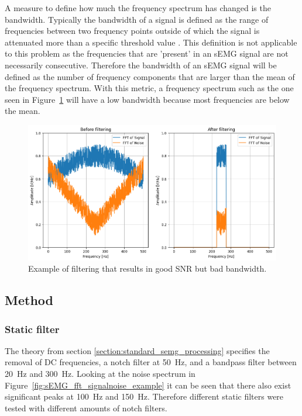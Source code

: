 A measure to define how much the frequency spectrum has changed is the bandwidth. Typically the bandwidth of a signal is defined as the range of frequencies between two frequency points outside of which the signal is attenuated more than a specific threshold value \cite{bandwidth_definition}. This definition is not applicable to this problem as the frequencies that are 'present' in an sEMG signal are not necessarily consecutive. Therefore the bandwidth of an sEMG signal will be defined as the number of frequency components that are larger than the mean of the frequency spectrum. With this metric, a frequency spectrum such as the one seen in Figure~\ref{fig:good_snr_bad_integrity} will have a low bandwidth because most frequencies are below the mean.

\begin{figure}[h!t]
	\begin{center}
		\includegraphics[width=1.0\columnwidth]{images/good_snr_bad_integrity.png}
	\end{center}
	\caption{Example of filtering that results in good SNR but bad bandwidth.}
	\label{fig:good_snr_bad_integrity}
\end{figure}


\subsection{Method}
\subsubsection{Static filter}
The theory from section \ref{section:standard_semg_processing} specifies the removal of DC frequencies, a notch filter at \SI{50}{Hz}, and a bandpass filter between \SI{20}{Hz} and \SI{300}{Hz}. Looking at the noise spectrum in Figure~\ref{fig:sEMG_fft_signalnoise_example} it can be seen that there also exist significant peaks at \SI{100}{Hz} and \SI{150}{Hz}. Therefore different static filters were tested with different amounts of notch filters. 

